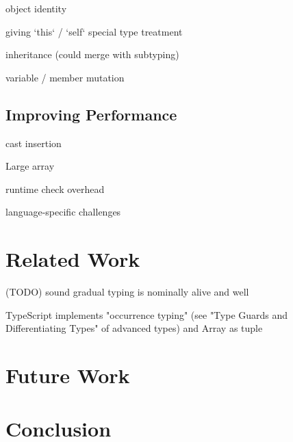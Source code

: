 object identity

giving `this` / `self` special type treatment

inheritance (could merge with subtyping)

variable / member mutation

\section{Improving Performance}

cast insertion

Large array

runtime check overhead

language-specific challenges



\renewcommand{\thechapter}{4}
\chapter{Related Work}

(TODO) sound gradual typing is nominally alive and well


TypeScript implements "occurrence typing" (see "Type Guards and Differentiating Types" of advanced types) and Array as tuple 
\renewcommand{\thechapter}{5}

\chapter{Future Work}

\renewcommand{\thechapter}{6}
\chapter{Conclusion}